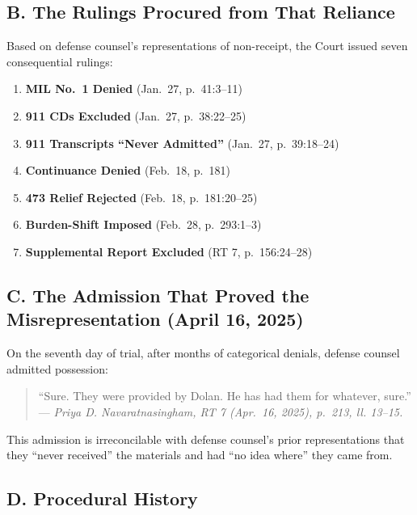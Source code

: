 \subsection{B. The Rulings Procured from That Reliance}\label{b.-the-rulings-procured-from-that-reliance}

Based on defense counsel's representations of non-receipt, the Court issued seven consequential rulings:

\begin{enumerate}
\def\labelenumi{\arabic{enumi}.}
\tightlist
\item
  \textbf{MIL No.~1 Denied} (Jan.~27, p.~41:3--11)
\item
  \textbf{911 CDs Excluded} (Jan.~27, p.~38:22--25)
\item
  \textbf{911 Transcripts ``Never Admitted''} (Jan.~27, p.~39:18--24)
\item
  \textbf{Continuance Denied} (Feb.~18, p.~181)
\item
  \textbf{\textsection{} 473 Relief Rejected} (Feb.~18, p.~181:20--25)
\item
  \textbf{Burden-Shift Imposed} (Feb.~28, p.~293:1--3)
\item
  \textbf{Supplemental Report Excluded} (RT 7, p.~156:24--28)
\end{enumerate}

\subsection{C. The Admission That Proved the Misrepresentation (April 16, 2025)}\label{c.-the-admission-that-proved-the-misrepresentation-april-16-2025}

On the seventh day of trial, after months of categorical denials, defense counsel admitted possession:

\begin{quote}
``Sure. They were provided by Dolan. He has had them for whatever, sure.'' --- \emph{Priya D. Navaratnasingham, RT 7 (Apr.~16, 2025), p.~213, ll. 13--15.}
\end{quote}

This admission is irreconcilable with defense counsel's prior representations that they ``never received'' the materials and had ``no idea where'' they came from.

\subsection{D. Procedural History}\label{d.-procedural-history}

